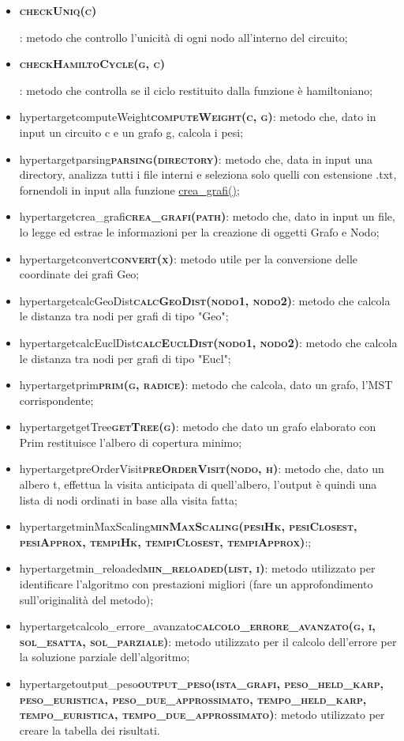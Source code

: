 \begin{itemize}
    \item \hypertarget{cehckUniq}{\textbf{\textsc{checkUniq(c)}}}: metodo che controllo l'unicità di ogni nodo all'interno del circuito;
    \item \hypertarget{checkHamiltoCycle}{\textbf{\textsc{checkHamiltoCycle(g, c)}}}: metodo che controlla se il ciclo restituito dalla funzione è hamiltoniano;
    \item hypertarget{computeWeight}{\textbf{\textsc{computeWeight(c, g)}}}: metodo che, dato in input un circuito c e un grafo g, calcola i pesi;
    \item hypertarget{parsing}{\textbf{\textsc{parsing(directory)}}}: metodo che, data in input una directory, analizza tutti i file interni e seleziona solo quelli con estensione .txt, fornendoli in input alla funzione \hyperlink{creagrafi}{crea\_grafi()};
    \item hypertarget{crea\_grafi}{\textbf{\textsc{crea\_grafi(path)}}}: metodo che, dato in input un file, lo legge ed estrae le informazioni per la creazione di oggetti Grafo e Nodo;
    \item hypertarget{convert}{\textbf{\textsc{convert(x)}}}: metodo utile per la conversione delle coordinate dei grafi Geo;
    \item hypertarget{calcGeoDist}{\textbf{\textsc{calcGeoDist(nodo1, nodo2)}}}: metodo che calcola le distanza tra nodi per grafi di tipo "Geo";
    \item hypertarget{calcEuclDist}{\textbf{\textsc{calcEuclDist(nodo1, nodo2)}}}: metodo che calcola le distanza tra nodi per grafi di tipo "Eucl";
    \item hypertarget{prim}{\textbf{\textsc{prim(g, radice)}}}: metodo che calcola, dato un grafo, l'MST corrispondente;
    \item hypertarget{getTree}{\textbf{\textsc{getTree(g)}}}: metodo che dato un grafo elaborato con Prim restituisce l'albero di copertura minimo;
    \item hypertarget{preOrderVisit}{\textbf{\textsc{preOrderVisit(nodo, h)}}}: metodo che, dato un albero t, effettua la visita anticipata di quell'albero, l'output è quindi una lista di nodi ordinati in base alla visita fatta;
    \item hypertarget{minMaxScaling}{\textbf{\textsc{minMaxScaling(pesiHk, pesiClosest, pesiApprox, tempiHk, tempiClosest, tempiApprox)}}}:;
    \item hypertarget{min\_reloaded}{\textbf{\textsc{min\_reloaded(list, i)}}}: metodo utilizzato per identificare l'algoritmo con prestazioni migliori (fare un approfondimento sull'originalità del metodo);
    \item hypertarget{calcolo\_errore\_avanzato}{\textbf{\textsc{calcolo\_errore\_avanzato(g, i, sol\_esatta, sol\_parziale)}}}: metodo utilizzato per il calcolo dell'errore per la soluzione parziale dell'algoritmo;
    \item hypertarget{output\_peso}{\textbf{\textsc{output\_peso(ista\_grafi, peso\_held\_karp, peso\_euristica, peso\_due\_approssimato, tempo\_held\_karp, tempo\_euristica, tempo\_due\_approssimato)}}}: metodo utilizzato per creare la tabella dei risultati.
\end{itemize}

